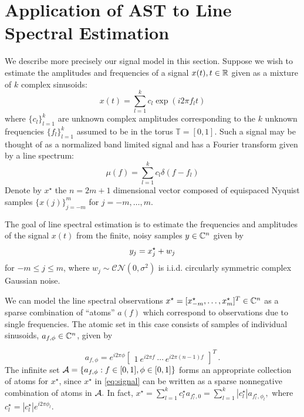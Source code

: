 \section{Application of AST to Line Spectral Estimation}
\label{sec:denoise-trig-moments} 

We describe more precisely our signal model in this section. Suppose we wish to
estimate the amplitudes and frequencies of a signal $x(t), t \in \mathbb{R}$ given as a
mixture of $k$ complex sinusoids:
\begin{equation*}
  x ( t) =  \sum_{l = 1}^k c_l \exp ( i 2 \pi f_l t)
\end{equation*}
where $\{ c_l \}_{l = 1}^k$ are unknown complex amplitudes corresponding to
the $k$ unknown frequencies $\{ f_l \}_{l = 1}^k$ assumed to be in the torus
$\mathbb{T} = [0, 1]$. Such a signal may be thought of as a normalized band
limited signal and has a Fourier transform given by a line spectrum:
\begin{equation}
\label{mu}
\mu(f) = \sum_{l=1}^k c_l\delta(f - f_l)
\end{equation}
Denote by $x^\star$ the $n = 2m+1$ dimensional vector composed of equispaced 
Nyquist samples $\{x(j)\}_{j=-m}^m$   for $j=-m,\ldots,m$.

The goal of line spectral estimation is to estimate the frequencies and 
amplitudes of the signal $x(t)$ from the finite, noisy samples $y \in \mathbb{C}^n$ 
given by
\[
  y_j  =  x_j^\star + w_j\\
\]
for $-m \leq j \leq m$, where $w_j \sim \mathcal{C}\mathcal{N}(0,\sigma^2)$ is 
i.i.d. circularly symmetric complex Gaussian noise. 

We can model the line spectral observations $x^\star = [x_{-m}^\star,
\ldots,x_{m}^\star]^T \in \mathbb{C}^n$ as a sparse combination of ``atoms'' $a(f)$ 
which correspond to observations due to single frequencies. The atomic set in this case consists of samples of individual sinusoids, $a_{f,\phi} \in \mathbb{C}^n$, given by

\begin{equation}
\label{eq:trig-atoms} a_{f,\phi} = e^{i2\pi \phi}\begin{bmatrix}1 ~ e^{i2\pi f} ~
\cdots ~ e^{i2\pi(n-1)f} \end{bmatrix}^T\,.
\end{equation}
The  infinite set $\mathcal{A} = \{ a_{f,\phi}: f \in
[0,1], \phi \in [0,1] \}$ forms an appropriate collection of atoms for
$x^\star$, since $x^\star$ in \eqref{eq:signal} can be written as a sparse
nonnegative combination of atoms in $\mathcal{A}.$ In fact, $x^\star = \sum_{l = 1}^k
c_l^\star a_{f_l^\star,0} = \sum_{l = 1}^k |c_l^\star| a_{f_l^\star,\phi_l},$
where $c_l^\star = |c_l^\star|e^{i2\pi\phi_l}.$

